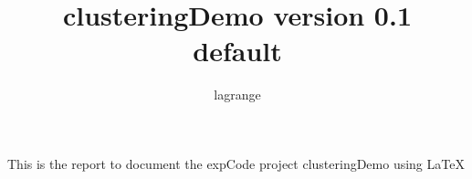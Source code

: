 \documentclass[10pt,a4paper,fleqn]{article}
\title{clusteringDemo version 0.1\\ default}
\author{ lagrange }
\begin{document}
 
  
\maketitle 
  
  
This is the report to document the expCode project clusteringDemo using \LaTeX 
  
  
  
% 
% 
  
\end{document}
